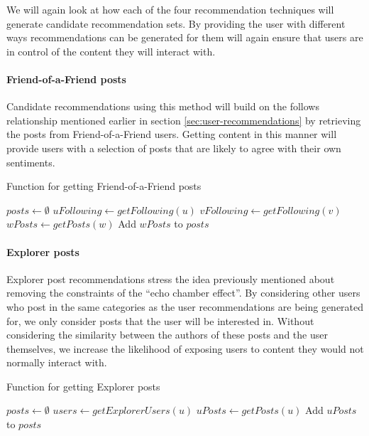 We will again look at how each of the four recommendation techniques will generate candidate recommendation sets. By providing the user with different ways recommendations can be generated for them will again ensure that users are in control of the content they will interact with. 

\paragraph{Friend-of-a-Friend posts} Candidate recommendations using this method will build on the follows relationship mentioned earlier in section \ref{sec:user-recommendations} by retrieving the posts from Friend-of-a-Friend users. Getting content in this manner will provide users with a selection of posts that are likely to agree with their own sentiments. 

\begin{algorithm}[H]
\caption{Function for getting Friend-of-a-Friend posts}
\label{alg:fof-content}
\begin{algorithmic}[1]
    \State $posts\gets \emptyset$
    \State $uFollowing\gets getFollowing(u)$
        \State $vFollowing\gets getFollowing(v)$
            \State $wPosts\gets getPosts(w)$
            \State Add $wPosts$ to $posts$
        \EndFor  
    \EndFor
    \State {}        
\EndFunction
\end{algorithmic}
\end{algorithm}

\paragraph{Explorer posts} Explorer post recommendations stress the idea previously mentioned about removing the constraints of the ``echo chamber effect''. By considering other users who post in the same categories as the user recommendations are being generated for, we only consider posts that the user will be interested in. Without considering the similarity between the authors of these posts and the user themselves, we increase the likelihood of exposing users to content they would not normally interact with.

\begin{algorithm}[H]
\caption{Function for getting Explorer posts}
\label{alg:explorer-content}
\begin{algorithmic}[1]
    \State $posts\gets \emptyset$
    \State $users\gets getExplorerUsers(u)$
        \State $uPosts\gets getPosts(u)$
        \State Add $uPosts$ to $posts$
    \EndFor
    \State {}
\EndFunction
\end{algorithmic}
\end{algorithm}

